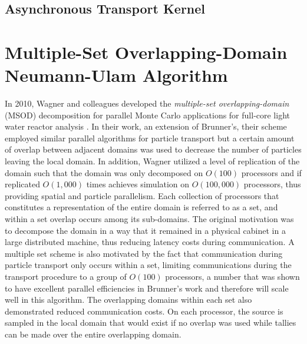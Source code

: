 \subsection{Asynchronous Transport Kernel}
\label{subsec:async_transport_kernel}

\clearpage

\section{Multiple-Set Overlapping-Domain Neumann-Ulam Algorithm}
\label{subsec:msod}
In 2010, Wagner and colleagues developed the \textit{multiple-set
  overlapping-domain} (MSOD) decomposition for parallel Monte Carlo
applications for full-core light water reactor analysis
\citep{wagner_hybrid_2010}. In their work, an extension of Brunner's,
their scheme employed similar parallel algorithms for particle
transport but a certain amount of overlap between adjacent domains was
used to decrease the number of particles leaving the local domain. In
addition, Wagner utilized a level of replication of the domain such
that the domain was only decomposed on $O(100)$ processors and if
replicated $O(1,000)$ times achieves simulation on $O(100,000)$
processors, thus providing spatial and particle parallelism. Each
collection of processors that constitutes a representation of the
entire domain is referred to as a set, and within a set overlap occurs
among its sub-domains. The original motivation was to decompose the
domain in a way that it remained in a physical cabinet in a large
distributed machine, thus reducing latency costs during
communication. A multiple set scheme is also motivated by the fact
that communication during particle transport only occurs within a set,
limiting communications during the transport procedure to a group of
$O(100)$ processors, a number that was shown to have excellent
parallel efficiencies in Brunner's work and therefore will scale well
in this algorithm. The overlapping domains within each set also
demonstrated reduced communication costs. On each processor, the
source is sampled in the local domain that would exist if no overlap
was used while tallies can be made over the entire overlapping domain.

